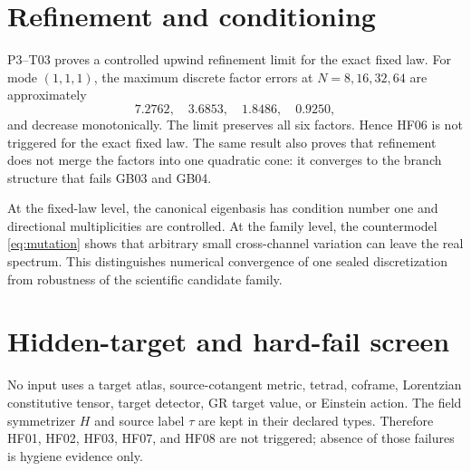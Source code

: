 \documentclass[11pt]{article}
\begin{document}
\section{Refinement and conditioning}

P3--T03 proves a controlled upwind refinement limit for the exact fixed law.
For mode $(1,1,1)$, the maximum discrete factor errors at
$N=8,16,32,64$ are approximately
\begin{equation}
 7.2762,\quad3.6853,\quad1.8486,\quad0.9250,
\end{equation}
and decrease monotonically.  The limit preserves all six factors.  Hence
HF06 is not triggered for the exact fixed law.  The same result also proves
that refinement does not merge the factors into one quadratic cone: it
converges to the branch structure that fails GB03 and GB04.

At the fixed-law level, the canonical eigenbasis has condition number one and
directional multiplicities are controlled.  At the family level, the
countermodel \eqref{eq:mutation} shows that arbitrary small cross-channel
variation can leave the real spectrum.  This distinguishes numerical
convergence of one sealed discretization from robustness of the scientific
candidate family.

\section{Hidden-target and hard-fail screen}

No input uses a target atlas, source-cotangent metric, tetrad, coframe,
Lorentzian constitutive tensor, target detector, GR target value, or Einstein
action.  The field symmetrizer $H$ and source label $\tau$ are kept in their
declared types.  Therefore HF01, HF02, HF03, HF07, and HF08 are not triggered;
absence of those failures is hygiene evidence only.
\end{document}
